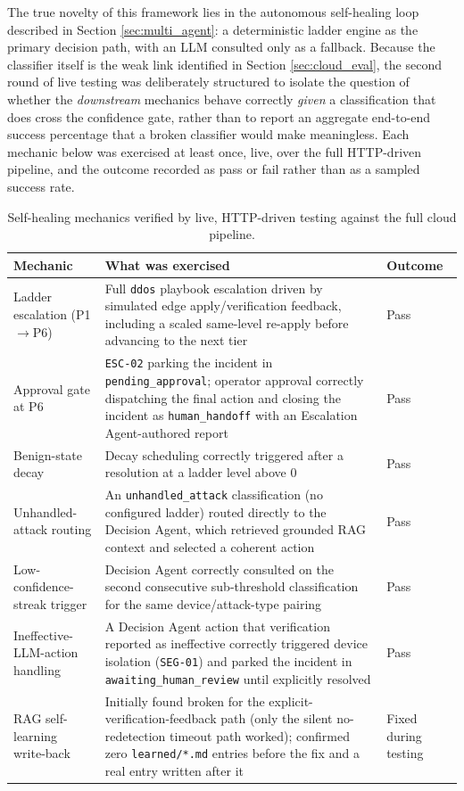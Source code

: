 The true novelty of this framework lies in the autonomous self-healing loop described in Section \ref{sec:multi_agent}: a deterministic ladder engine as the primary decision path, with an LLM consulted only as a fallback. Because the classifier itself is the weak link identified in Section \ref{sec:cloud_eval}, the second round of live testing was deliberately structured to isolate the question of whether the \textit{downstream} mechanics behave correctly \textit{given} a classification that does cross the confidence gate, rather than to report an aggregate end-to-end success percentage that a broken classifier would make meaningless. Each mechanic below was exercised at least once, live, over the full HTTP-driven pipeline, and the outcome recorded as pass or fail rather than as a sampled success rate.

\begin{table}[htbp]
\caption{Self-healing mechanics verified by live, HTTP-driven testing against the full cloud pipeline.}
\label{tb:mas_results}
\centering
\begin{tabular*}{\textwidth}{@{\extracolsep{\fill}}|p{}|p{}|p{}|}
\hline
\textbf{Mechanic} & \textbf{What was exercised} & \textbf{Outcome} \\
\hline
Ladder escalation (P1$\to$P6) & Full \texttt{ddos} playbook escalation driven by simulated edge apply/verification feedback, including a scaled same-level re-apply before advancing to the next tier & Pass \\
\hline
Approval gate at P6 & \texttt{ESC-02} parking the incident in \texttt{pending\_approval}; operator approval correctly dispatching the final action and closing the incident as \texttt{human\_handoff} with an Escalation Agent-authored report & Pass \\
\hline
Benign-state decay & Decay scheduling correctly triggered after a resolution at a ladder level above 0 & Pass \\
\hline
Unhandled-attack routing & An \texttt{unhandled\_attack} classification (no configured ladder) routed directly to the Decision Agent, which retrieved grounded RAG context and selected a coherent action & Pass \\
\hline
Low-confidence-streak trigger & Decision Agent correctly consulted on the second consecutive sub-threshold classification for the same device/attack-type pairing & Pass \\
\hline
Ineffective-LLM-action handling & A Decision Agent action that verification reported as ineffective correctly triggered device isolation (\texttt{SEG-01}) and parked the incident in \texttt{awaiting\_human\_review} until explicitly resolved & Pass \\
\hline
RAG self-learning write-back & Initially found broken for the explicit-verification-feedback path (only the silent no-redetection timeout path worked); confirmed zero \texttt{learned/*.md} entries before the fix and a real entry written after it & Fixed during testing \\
\hline
\end{tabular*}
\end{table}

